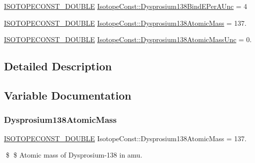 \begin{DoxyCompactItemize}
\mbox{\hyperlink{group___isotope_const-_macros_ga8f45a7272ce02c0b4c65c44636ed719a}{I\+S\+O\+T\+O\+P\+E\+C\+O\+N\+S\+T\+\_\+\+D\+O\+U\+B\+LE}} \mbox{\hyperlink{group___isotope_const-_dysprosium-_dy138_gac3a6a04f9ad0f35957d8b82b4d216b4e}{Isotope\+Const\+::\+Dysprosium138\+Bind\+E\+Per\+A\+Unc}} = 4
\item 
\mbox{\hyperlink{group___isotope_const-_macros_ga8f45a7272ce02c0b4c65c44636ed719a}{I\+S\+O\+T\+O\+P\+E\+C\+O\+N\+S\+T\+\_\+\+D\+O\+U\+B\+LE}} \mbox{\hyperlink{group___isotope_const-_dysprosium-_dy138_ga3bd6a1b60ebaa8551c0e335b21a0e80e}{Isotope\+Const\+::\+Dysprosium138\+Atomic\+Mass}} = 137.
\item 
\mbox{\hyperlink{group___isotope_const-_macros_ga8f45a7272ce02c0b4c65c44636ed719a}{I\+S\+O\+T\+O\+P\+E\+C\+O\+N\+S\+T\+\_\+\+D\+O\+U\+B\+LE}} \mbox{\hyperlink{group___isotope_const-_dysprosium-_dy138_ga0446a02f61533909102d5d5c5e50e6c0}{Isotope\+Const\+::\+Dysprosium138\+Atomic\+Mass\+Unc}} = 0.
\end{DoxyCompactItemize}


\subsection{Detailed Description}


\subsection{Variable Documentation}
\mbox{\label{group___isotope_const-_dysprosium-_dy138_ga3bd6a1b60ebaa8551c0e335b21a0e80e}} 
\subsubsection{\texorpdfstring{Dysprosium138\+Atomic\+Mass}{Dysprosium138AtomicMass}}
{\footnotesize\ttfamily \mbox{\hyperlink{group___isotope_const-_macros_ga8f45a7272ce02c0b4c65c44636ed719a}{I\+S\+O\+T\+O\+P\+E\+C\+O\+N\+S\+T\+\_\+\+D\+O\+U\+B\+LE}} Isotope\+Const\+::\+Dysprosium138\+Atomic\+Mass = 137.}

\$ \$ Atomic mass of Dysprosium-\/138 in amu. \mbox{\label{group___isotope_const-_dysprosium-_dy138_ga0446a02f61533909102d5d5c5e50e6c0}} 
